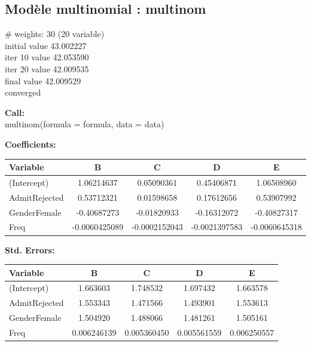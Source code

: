 \documentclass[10pt,french]{report}
\begin{document}
    \subsection{Modèle multinomial : multinom}

    \begin{flushleft}
    \# weights: 30 (20 variable) \\
    initial value 43.002227 \\
    iter 10 value 42.053590 \\
    iter 20 value 42.009535 \\
    final value 42.009529 \\
    converged
    \end{flushleft}

    \begin{flushleft}
    \textbf{Call:} \\
    multinom(formula = formula, data = data)
    \end{flushleft}

    \begin{flushleft}
    \textbf{Coefficients:}
    \end{flushleft}

    \begin{longtable}{lcccc}
    \hline
    \textbf{Variable} & \textbf{B} & \textbf{C} & \textbf{D} & \textbf{E} \\
    \hline
    \endfirsthead
    \hline
    (Intercept) & 1.06214637 & 0.05090361 & 0.45406871 & 1.06508960 \\
    AdmitRejected & 0.53712321 & 0.01598658 & 0.17612656 & 0.53907992 \\
    GenderFemale & -0.40687273 & -0.01820933 & -0.16312072 & -0.40827317 \\
    Freq & -0.0060425089 & -0.0002152043 & -0.0021397583 & -0.0060645318 \\
    \hline
    \end{longtable}

    \begin{flushleft}
    \textbf{Std. Errors:}
    \end{flushleft}

    \begin{longtable}{lcccc}
    \hline
    \textbf{Variable} & \textbf{B} & \textbf{C} & \textbf{D} & \textbf{E} \\
    \hline
    \endfirsthead
    \hline
    (Intercept) & 1.663603 & 1.748532 & 1.697432 & 1.663578 \\
    AdmitRejected & 1.553343 & 1.471566 & 1.493901 & 1.553613 \\
    GenderFemale & 1.504920 & 1.488066 & 1.481261 & 1.505161 \\
    Freq & 0.006246139 & 0.005360450 & 0.005561559 & 0.006250557 \\
    \hline
    \end{longtable}
\end{document}
